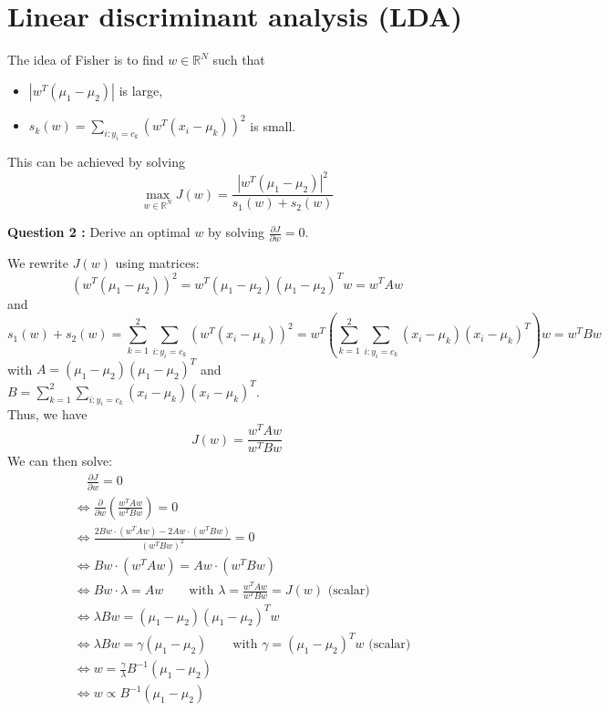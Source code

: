 \documentclass[12pt,a4paper]{article}
\begin{document}
\color{black}

\section{Linear discriminant analysis (LDA)}

The idea of Fisher is to find $w \in \mathbb{R}^N$ such that
\begin{itemize}
    \item $|w^T(\mu_1 - \mu_2)|$ is large,
    \item $s_k(w) = \sum_{i:y_i=c_k} (w^T (x_i - \mu_k))^2$ is small.
\end{itemize}

This can be achieved by solving
$$
\max_{w \in \mathbb{R}^N} J(w) = \frac{|w^T(\mu_1 - \mu_2)|^2}{s_1(w) + s_2(w)}
$$

\newpage


\noindent\textbf{Question 2 :}
Derive an optimal $w$ by solving $\frac{\partial J}{\partial w} = 0$.\\

\color{blue}

We rewrite $J(w)$ using matrices:
$$
(w^T(\mu_1 - \mu_2))^2 = w^T (\mu_1 - \mu_2)(\mu_1 - \mu_2)^T w = w^T A w
$$
and
$$
s_1(w) + s_2(w) = \sum_{k=1}^2 \sum_{i:y_i=c_k} (w^T (x_i - \mu_k))^2 = w^T \left( \sum_{k=1}^2 \sum_{i:y_i=c_k} (x_i - \mu_k)(x_i - \mu_k)^T \right) w = w^T B w
$$
with $A = (\mu_1 - \mu_2)(\mu_1 - \mu_2)^T$ and $B = \sum_{k=1}^2 \sum_{i:y_i=c_k} (x_i - \mu_k)(x_i - \mu_k)^T$. \\

Thus, we have
$$
J(w) = \frac{w^T A w}{w^T B w}
$$
We can then solve:
\begin{align*}
    &\quad \frac{\partial J}{\partial w} = 0 \\
    &\Leftrightarrow \frac{\partial}{\partial w} \left( \frac{w^T A w}{w^T B w} \right) = 0 \\
    &\Leftrightarrow \frac{2 B w \cdot (w^T A w) - 2A w \cdot (w^T B w)}{(w^T B w)^2} = 0 \\
    &\Leftrightarrow B w \cdot (w^T A w) = A w \cdot (w^T B w) \\
    &\Leftrightarrow B w \cdot \lambda = A w \qquad \text{with } \lambda = \frac{w^T A w}{w^T B w} = J(w) \text{ (scalar)} \\
    &\Leftrightarrow \lambda B w = (\mu_1 - \mu_2)(\mu_1 - \mu_2)^T w \\
    &\Leftrightarrow \lambda B w = \gamma (\mu_1 - \mu_2) \qquad \text{with } \gamma = (\mu_1 - \mu_2)^T w \text{ (scalar)} \\
    &\Leftrightarrow w = \frac{\gamma}{\lambda} B^{-1} (\mu_1 - \mu_2) \\
    &\Leftrightarrow w \propto B^{-1} (\mu_1 - \mu_2)
\end{align*}\\
\end{document}
